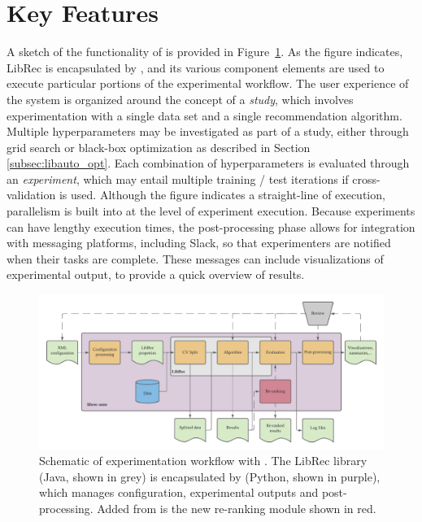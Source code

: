 \section{Key Features}
\label{sec:libauto_keyfeatures}

A sketch of the functionality of \libauto{} is provided in Figure~\ref{fig:librec-auto}. As the figure indicates, LibRec is encapsulated by \libauto{}, and its various component elements are used to execute particular portions of the experimental workflow. The user experience of the system is organized around the concept of a \textit{study}, which involves experimentation with a single data set and a single recommendation algorithm. Multiple hyperparameters may be investigated as part of a study, either through grid search or black-box optimization as described in Section \ref{subsec:libauto_opt}. Each combination of hyperparameters is evaluated through an \textit{experiment}, which may entail multiple training / test iterations if cross-validation is used. Although the figure indicates a straight-line of execution, parallelism is built into \libauto{} at the level of experiment execution. Because experiments can have lengthy execution times, the post-processing phase allows for integration with messaging platforms, including Slack, so that experimenters are notified when their tasks are complete. These messages can include visualizations of experimental output, to provide a quick overview of results.

\begin{figure}[!htb]
    \centering
    \includegraphics[width=0.95\linewidth]{imgs/la/workflow.pdf}
    \caption{Schematic of experimentation workflow with \libauto{}. The LibRec library (Java, shown in grey) is encapsulated by \libauto{} (Python, shown in purple), which manages configuration, experimental outputs and post-processing. Added from \cite{mansoury2018automating} is the new re-ranking module shown in red.}
    \label{fig:librec-auto}
    \vspace{-0.15in}
\end{figure}

